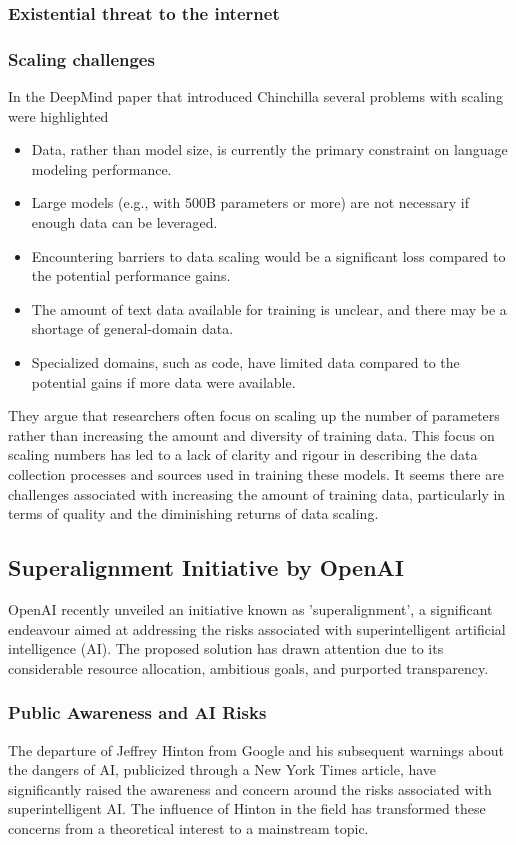 \subsubsection{Existential threat to the internet}
\subsubsection{Scaling challenges}
In the DeepMind paper that introduced Chinchilla \cite{hoffmann2022empirical} several problems with scaling were highlighted
\begin{itemize}
\item Data, rather than model size, is currently the primary constraint on language modeling performance.
\item Large models (e.g., with 500B parameters or more) are not necessary if enough data can be leveraged.
\item Encountering barriers to data scaling would be a significant loss compared to the potential performance gains.
\item The amount of text data available for training is unclear, and there may be a shortage of general-domain data.
\item Specialized domains, such as code, have limited data compared to the potential gains if more data were available.
\end{itemize}
They argue that researchers often focus on scaling up the number of parameters rather than increasing the amount and diversity of training data. This focus on scaling numbers has led to a lack of clarity and rigour in describing the data collection processes and sources used in training these models. It seems  there are challenges associated with increasing the amount of training data, particularly in terms of quality and the diminishing returns of data scaling. 

\subsection{Superalignment Initiative by OpenAI}
OpenAI recently unveiled an initiative known as 'superalignment', a significant endeavour aimed at addressing the risks associated with superintelligent artificial intelligence (AI). The proposed solution has drawn attention due to its considerable resource allocation, ambitious goals, and purported transparency.

\subsubsection{Public Awareness and AI Risks}
The departure of Jeffrey Hinton from Google and his subsequent warnings about the dangers of AI, publicized through a New York Times article, have significantly raised the awareness and concern around the risks associated with superintelligent AI. The influence of Hinton in the field has transformed these concerns from a theoretical interest to a mainstream topic.

